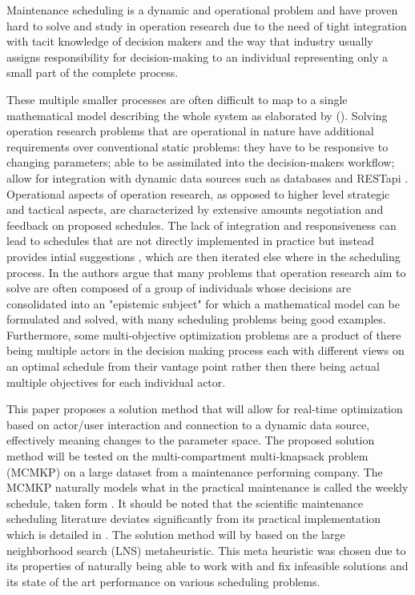 \documentclass[preprint,12pt,authoryear]{elsarticle}
\begin{document}
Maintenance scheduling is a dynamic and operational problem and have proven hard to solve and study in operation research due to the need of tight integration with tacit knowledge of decision makers and 
the way that industry usually assigns responsibility for decision-making 
to an individual representing only a small part of the complete process. 

These multiple smaller processes are often difficult to map to a single mathematical model describing the whole system as elaborated by (\citep{barthelemy_human_2002}).
Solving operation research problems that are operational in nature have additional requirements over conventional static problems: they have to be responsive to changing parameters; 
able to be assimilated into the decision-makers workflow; allow for integration with dynamic data sources such as databases and RESTapi \citep{meignan_review_2015}. 
Operational aspects of operation research, as opposed to higher level strategic and tactical aspects, are characterized by extensive amounts negotiation and feedback on 
proposed schedules. The lack of integration and responsiveness can lead to schedules that are not directly implemented in practice but instead provides intial suggestions \cite{meignan_review_2015}, which are
then iterated else where in the scheduling process. In \citep{barthelemy_human_2002} the authors argue that many problems that operation research aim to solve are often composed of a group of individuals whose decisions are 
consolidated into an "epistemic subject" for which a mathematical model can be formulated and solved, with many scheduling problems being good examples. Furthermore, some multi-objective optimization problems are a product of 
there being multiple actors in the decision making process each with different views on an optimal schedule from their vantage point rather then there being actual multiple objectives for each individual actor.

This paper proposes a solution method that will allow for real-time optimization based on actor/user interaction and connection to a dynamic 
data source, effectively meaning changes to the parameter space. The proposed solution method will be tested on the multi-compartment multi-knapsack problem (MCMKP) on a large dataset from a maintenance performing company. The MCMKP 
naturally models what in the practical maintenance is called the weekly schedule, taken form \citep{palmerMaintenancePlanningScheduling2019}. It should be noted 
that the scientific maintenance scheduling literature deviates significantly from its practical implementation which is detailed in \citep{palmerMaintenancePlanningScheduling2019}. 
The solution method will by based on the large neighborhood search (LNS) metaheuristic. This meta heuristic was chosen due to its properties of naturally being able to work with and fix 
infeasible solutions and its state of the art performance on various scheduling problems. 
\end{document}
